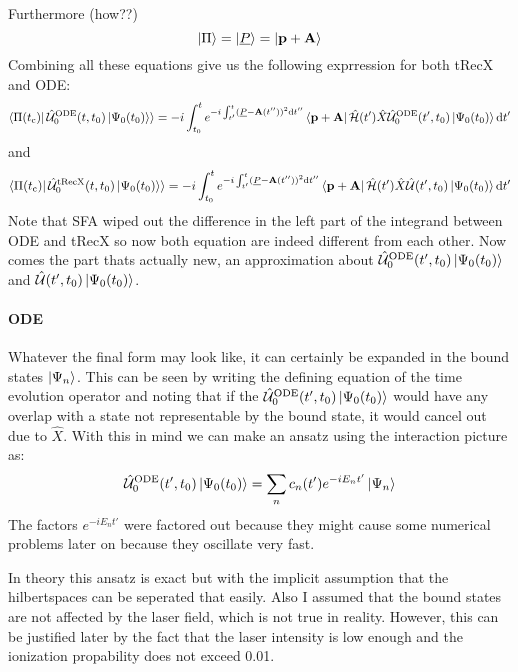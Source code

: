 Furthermore (how??)
\begin{equation*}
    \ket{\Pi} = \ket{\underline{P}} = \ket{\mathbf{p}+\mathbf{A}}
\end{equation*}
Combining all these equations give us the following exprression for both tRecX and ODE:
\begin{equation}
    \braket{\Pi(t_{\mathrm{c}})|\,\hat{\mathcal{U}}^{\mathrm{ODE}}_0(t,t_0)\ket{\Psi_0(t_0)}} = -i \int_{t_0}^{t} e^{-i \int_{t'}^{t} (\underline{P} - \mathbf{A}(t''))^2 \mathrm{d} t''}\bra{\mathbf{p}+\mathbf{A}}\hat{\mathcal{H}}(t')\hat{X} \hat{\mathcal{U}}^{\mathrm{ODE}}_0(t',t_0)\ket{\Psi_0(t_0)} \mathrm{d} t' \label{eq:smatrixlike1}
\end{equation}
and
\begin{equation}
    \braket{\Pi(t_{\mathrm{c}})|\,\hat{\mathcal{U}}^{\mathrm{tRecX}}_0(t,t_0)\ket{\Psi_0(t_0)}} = -i \int_{t_0}^{t} e^{-i \int_{t'}^{t} (\underline{P} - \mathbf{A}(t''))^2 \mathrm{d} t''}\bra{\mathbf{p}+\mathbf{A}}\hat{\mathcal{H}}(t')\hat{X} \hat{\mathcal{U}}(t',t_0)\ket{\Psi_0(t_0)} \mathrm{d} t' \label{eq:smatrixlike2}
\end{equation}
Note that SFA wiped out the difference in the left part of the integrand between ODE and tRecX so now both equation are indeed different from each other.
Now comes the part thats actually new, an approximation about $\hat{\mathcal{U}}^{\mathrm{ODE}}_0(t',t_0)\ket{\Psi_0(t_0)}$ and $\hat{\mathcal{U}}(t',t_0)\ket{\Psi_0(t_0)}$.

\paragraph{ODE}
Whatever the final form may look like, it can certainly be expanded in the bound states $\ket{\Psi_n}$. 
This can be seen by writing the defining equation of the time evolution operator and noting that if the $\hat{\mathcal{U}}^{\mathrm{ODE}}_0(t',t_0)\ket{\Psi_0(t_0)}$ would have any overlap with a state not representable by the bound state, it would cancel out due to $\hat{X}$.
With this in mind we can make an ansatz using the interaction picture as:
\begin{equation*}
    \hat{\mathcal{U}}^{\mathrm{ODE}}_0(t',t_0)\ket{\Psi_0(t_0)} = \sum_{n}c_n(t')e^{-iE_nt'}\ket{\Psi_n}
\end{equation*}
The factors $e^{-iE_nt'}$ were factored out because they might cause some numerical problems later on because they oscillate very fast.

In theory this ansatz is exact but with the implicit assumption that the hilbertspaces can be seperated that easily. 
Also I assumed that the bound states are not affected by the laser field, which is not true in reality.
However, this can be justified later by the fact that the laser intensity is low enough and the ionization propability does not exceed 0.01.

